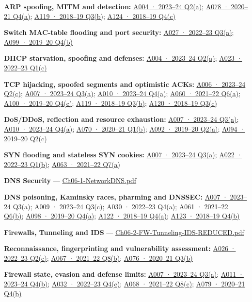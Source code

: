 \documentclass[11pt,a4paper]{article}
\begin{document}
\textbf{ARP spoofing,\allowbreak{} MITM and detection:} \hyperref[a004]{A004 · 2023–24 Q2(a)}; \hyperref[a078]{A078 · 2020–21 Q4(a)}; \hyperref[a119]{A119 · 2018–19 Q3(b)}; \hyperref[a124]{A124 · 2018–19 Q4(c)}


\textbf{Switch MAC-table flooding and port security:} \hyperref[a027]{A027 · 2022–23 Q3(a)}; \hyperref[a099]{A099 · 2019–20 Q4(b)}


\textbf{DHCP starvation,\allowbreak{} spoofing and defenses:} \hyperref[a004]{A004 · 2023–24 Q2(a)}; \hyperref[a023]{A023 · 2022–23 Q1(c)}


\textbf{TCP hijacking,\allowbreak{} spoofed segments and optimistic ACKs:} \hyperref[a006]{A006 · 2023–24 Q2(c)}; \hyperref[a007]{A007 · 2023–24 Q3(a)}; \hyperref[a010]{A010 · 2023–24 Q4(a)}; \hyperref[a060]{A060 · 2021–22 Q6(a)}; \hyperref[a100]{A100 · 2019–20 Q4(c)}; \hyperref[a119]{A119 · 2018–19 Q3(b)}; \hyperref[a120]{A120 · 2018–19 Q3(c)}


\textbf{DoS/\allowbreak{}DDoS,\allowbreak{} reflection and resource exhaustion:} \hyperref[a007]{A007 · 2023–24 Q3(a)}; \hyperref[a010]{A010 · 2023–24 Q4(a)}; \hyperref[a070]{A070 · 2020–21 Q1(b)}; \hyperref[a092]{A092 · 2019–20 Q2(a)}; \hyperref[a094]{A094 · 2019–20 Q2(c)}


\textbf{SYN flooding and stateless SYN cookies:} \hyperref[a007]{A007 · 2023–24 Q3(a)}; \hyperref[a022]{A022 · 2022–23 Q1(b)}; \hyperref[a063]{A063 · 2021–22 Q7(a)}


\textbf{DNS Security} — \href{../slides/Ch06-1-NetworkDNS.pdf}{Ch06-1-NetworkDNS.\allowbreak{}pdf}


\textbf{DNS poisoning,\allowbreak{} Kaminsky races,\allowbreak{} pharming and DNSSEC:} \hyperref[a007]{A007 · 2023–24 Q3(a)}; \hyperref[a009]{A009 · 2023–24 Q3(c)}; \hyperref[a030]{A030 · 2022–23 Q4(a)}; \hyperref[a061]{A061 · 2021–22 Q6(b)}; \hyperref[a098]{A098 · 2019–20 Q4(a)}; \hyperref[a122]{A122 · 2018–19 Q4(a)}; \hyperref[a123]{A123 · 2018–19 Q4(b)}


\textbf{Firewalls,\allowbreak{} Tunneling and IDS} — \href{../slides/Ch06-2-FW-Tunneling-IDS-REDUCED.pdf}{Ch06-2-FW-Tunneling-IDS-REDUCED.\allowbreak{}pdf}


\textbf{Reconnaissance,\allowbreak{} fingerprinting and vulnerability assessment:} \hyperref[a026]{A026 · 2022–23 Q2(c)}; \hyperref[a067]{A067 · 2021–22 Q8(b)}; \hyperref[a076]{A076 · 2020–21 Q3(b)}


\textbf{Firewall state,\allowbreak{} evasion and defense limits:} \hyperref[a007]{A007 · 2023–24 Q3(a)}; \hyperref[a011]{A011 · 2023–24 Q4(b)}; \hyperref[a032]{A032 · 2022–23 Q4(c)}; \hyperref[a068]{A068 · 2021–22 Q8(c)}; \hyperref[a079]{A079 · 2020–21 Q4(b)}
\end{document}
